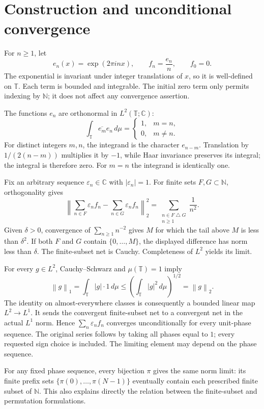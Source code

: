 \documentclass[11pt]{article}
\newcommand{\T}{\mathbb{T}}
\newcommand{\N}{\mathbb{N}}
\newcommand{\C}{\mathbb{C}}
\newcommand{\norm}[1]{\left\lVert#1\right\rVert}
\begin{document}
\section{Construction and unconditional convergence}
For $n\geq1$, let
\[
 e_n(x)=\exp(2\pi i n x),\qquad f_n=\frac{e_n}{n},
 \qquad f_0=0.
\]
The exponential is invariant under integer translations of $x$, so it is
well-defined on $\T$. Each term is bounded and integrable. The initial zero
term only permits indexing by $\N$; it does not affect any convergence assertion.

The functions $e_n$ are orthonormal in $L^2(\T;\C)$:
\[
 \int_{\T}\overline{e_m}e_n\,d\mu=
 \begin{cases}1,&m=n,\\0,&m\ne n.\end{cases}
\]
For distinct integers $m,n$, the integrand is the character $e_{n-m}$.
Translation by $1/(2(n-m))$ multiplies it by $-1$, while Haar invariance
preserves its integral; the integral is therefore zero. For $m=n$ the
integrand is identically one.

Fix an arbitrary sequence $\varepsilon_n\in\C$ with $|\varepsilon_n|=1$.
For finite sets $F,G\subset\N$, orthogonality gives
\[
 \left\lVert\sum_{n\in F}\varepsilon_n f_n
       -\sum_{n\in G}\varepsilon_n f_n\right\rVert_2^2
   =\sum_{\substack{n\in F\mathbin{\triangle}G\\n\geq1}}\frac1{n^2}.
\]
Given $\delta>0$, convergence of $\sum_{n\geq1}n^{-2}$ gives $M$ for which
the tail above $M$ is less than $\delta^2$. If both $F$ and $G$ contain
$\{0,\ldots,M\}$, the displayed difference has norm less than $\delta$.
The finite-subset net is Cauchy. Completeness of $L^2$ yields its limit.

For every $g\in L^2$, Cauchy--Schwarz and $\mu(\T)=1$ imply
\[
 \norm{g}_1=\int_{\T}|g|\cdot1\,d\mu
       \leq\left(\int_{\T}|g|^2\,d\mu\right)^{1/2}
       =\norm{g}_2.
\]
The identity on almost-everywhere classes is consequently a bounded linear
map $L^2\to L^1$. It sends the convergent finite-subset net to a convergent
net in the actual $L^1$ norm. Hence $\sum_n\varepsilon_n f_n$ converges
unconditionally for every unit-phase sequence. The original series follows
by taking all phases equal to $1$; every requested sign choice is included.
The limiting element may depend on the phase sequence.

For any fixed phase sequence, every bijection $\pi$ gives the same norm
limit: its finite prefix sets $\{\pi(0),\ldots,\pi(N-1)\}$ eventually contain
each prescribed finite subset of $\N$. This also explains directly the
relation between the finite-subset and permutation formulations.
\end{document}
